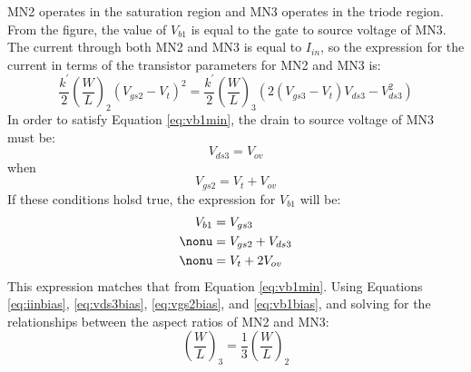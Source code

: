 MN2 operates in the saturation region and MN3 operates in the triode region. From the figure, the value of $V_{b1}$ is equal to the gate to source voltage of MN3. The current through both MN2 and MN3 is equal to $I_{in}$, so the expression for the current in terms of the transistor parameters for MN2 and MN3 is:
\begin{equation}
\label{eq:iinbias}
\dfrac{k^{'}}{2}\left(\dfrac{W}{L}\right)_{2}(V_{gs2} - V_{t})^2 = \dfrac{k^{'}}{2}\left(\dfrac{W}{L}\right)_{3}\left(2(V_{gs3} - V_{t})V_{ds3}-V_{ds3}^2\right)
\end{equation}
In order to satisfy Equation \ref{eq:vb1min}, the drain to source voltage of MN3 must be:
\begin{equation}
\label{eq:vds3bias}
V_{ds3} = V_{ov}
\end{equation}
when
\begin{equation}
\label{eq:vgs2bias}
V_{gs2} = V_{t}+V_{ov}
\end{equation}
If these conditions holsd true, the expression for $V_{b1}$ will be:
\begin{align}
\label{eq:vb1bias}
V_{b1} &= V_{gs3} \\
\nonu  &= V_{gs2} + V_{ds3} \\
\nonu	   &= V_{t} + 2V_{ov} 
\end{align}
This expression matches that from Equation \ref{eq:vb1min}. Using Equations \ref{eq:iinbias}, \ref{eq:vds3bias}, \ref{eq:vgs2bias}, and \ref{eq:vb1bias}, and solving for the relationships between the aspect ratios of MN2 and MN3:
\begin{equation}
\left(\dfrac{W}{L}\right)_{3} = \dfrac{1}{3}\left(\dfrac{W}{L}\right)_{2}
\end{equation}

